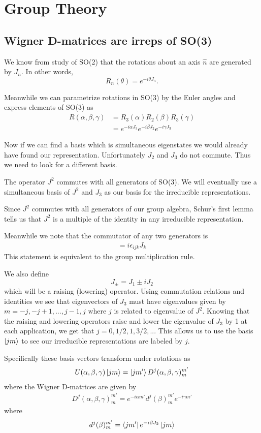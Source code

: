 \documentclass{article}
\begin{document}
%
%
\section{Group Theory}


\subsection{Wigner D-matrices are irreps of SO(3)}
We know from study of SO(2) that the rotations about an axis $\hat{n}$ are generated by $J_n$. In other words, $$R_n(\theta) = e^{-i\theta J_n} .$$

Meanwhile we can parametrize rotations in SO(3) by the Euler angles and express elements of SO(3) as 
\begin{align}
    R(\alpha,\beta,\gamma) &= R_3(\alpha)R_2(\beta)R_3(\gamma)\\
    &= e^{-i\alpha J_3} e^{-i\beta J_2} e^{-i\gamma J_3}
\end{align}

Now if we can find a basis which is simultaneous eigenstates we would already have found our representation. Unfortunately $J_2$ and $J_3$ do not commute. Thus we need to look for a different basis. 

The operator $J^2$ commutes with all generators of SO(3). We will eventually use a simultaneous basis of $J^2$ and $J_3$ as our basis for the irreducible representations. 

Since $J^2$ commutes with all generators of our group algebra, Schur's first lemma tells us that $J^2$ is a multiple of the identity in any irreducible representation. 

Meanwhile we note that the commutator of any two generators is \begin{align}
    [J_i,J_j] = i \epsilon_{ijk}J_k
\end{align}
This statement is equivalent to the group multiplication rule.

We also define $$J_{\pm} = J_1 \pm iJ_2$$ which will be a raising (lowering) operator. Using commutation relations and identities we see that eigenvectors of $J_3$ must have eigenvalues given by $m = -j,-j+1,...,j-1,j$ where $j$ is related to eigenvalue of $J^2$. Knowing that the raising and lowering operators raise and lower the eigenvalue of $J_3$ by 1 at each application, we get that $j = 0,1/2,1,3/2,...$ 
This allows us to use the basis $\ket{jm}$ to see our irreducible representations are labeled by $j$.

Specifically these basis vectors transform under rotations as 
\begin{align}
    U(\alpha,\beta,\gamma)\ket{jm} = \ket{jm'}D^j(\alpha,\beta,\gamma)^{m'}_m
\end{align}
where the Wigner D-matrices are given by 
\begin{align}
    D^j(\alpha,\beta,\gamma)^{m'}_m = e^{-i\alpha m'}d^j(\beta)^{m'}_m e^{-i\gamma m'}
\end{align}
where
\begin{align}
    d^j(\beta)^{m'}_m = \bra{jm'}e^{-i\beta J_2}\ket{jm}
\end{align}
\end{document}
